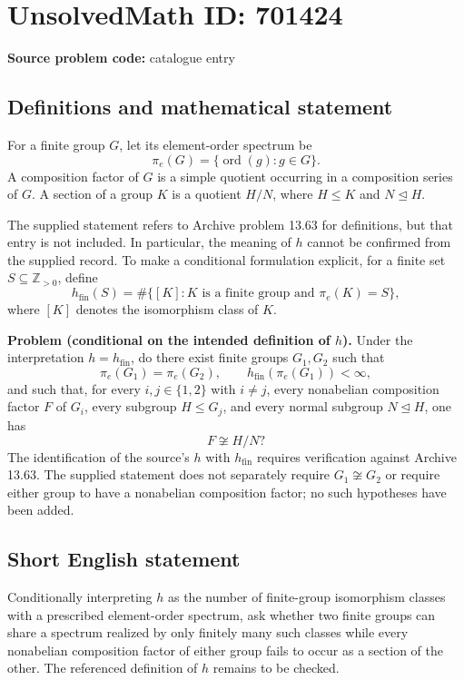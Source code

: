 \documentclass[11pt]{article}
\newcommand{\Z}{\mathbb{Z}}
\begin{document}
\section*{UnsolvedMath ID: 701424}
\textbf{Source problem code:} catalogue entry
\subsection{Definitions and mathematical statement}
For a finite group \(G\), let its element-order spectrum be
\[
\pi_e(G)=\{\operatorname{ord}(g):g\in G\}.
\]
A composition factor of \(G\) is a simple quotient occurring in a composition series of \(G\). A section of a group \(K\) is a quotient \(H/N\), where \(H\le K\) and \(N\trianglelefteq H\).

The supplied statement refers to Archive problem 13.63 for definitions, but that entry is not included. In particular, the meaning of \(h\) cannot be confirmed from the supplied record. To make a conditional formulation explicit, for a finite set \(S\subseteq\Z_{>0}\), define
\[
h_{\mathrm{fin}}(S)=\#\{[K]:K\text{ is a finite group and }\pi_e(K)=S\},
\]
where \([K]\) denotes the isomorphism class of \(K\).

\textbf{Problem (conditional on the intended definition of \(h\)).} Under the interpretation \(h=h_{\mathrm{fin}}\), do there exist finite groups \(G_1,G_2\) such that
\[
\pi_e(G_1)=\pi_e(G_2),\qquad h_{\mathrm{fin}}(\pi_e(G_1))<\infty,
\]
and such that, for every \(i,j\in\{1,2\}\) with \(i\ne j\), every nonabelian composition factor \(F\) of \(G_i\), every subgroup \(H\le G_j\), and every normal subgroup \(N\trianglelefteq H\), one has
\[
F\not\cong H/N?
\]
The identification of the source's \(h\) with \(h_{\mathrm{fin}}\) requires verification against Archive 13.63. The supplied statement does not separately require \(G_1\not\cong G_2\) or require either group to have a nonabelian composition factor; no such hypotheses have been added.
\subsection{Short English statement}
Conditionally interpreting \(h\) as the number of finite-group isomorphism classes with a prescribed element-order spectrum, ask whether two finite groups can share a spectrum realized by only finitely many such classes while every nonabelian composition factor of either group fails to occur as a section of the other. The referenced definition of \(h\) remains to be checked.
\end{document}
